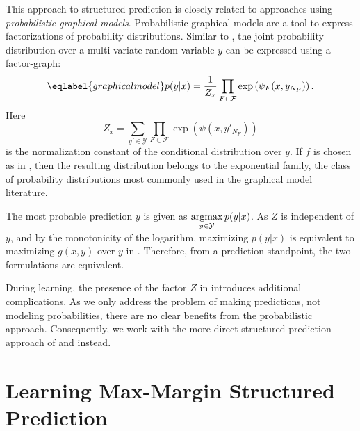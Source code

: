 This approach to structured prediction is closely related to 
approaches using \emph{probabilistic graphical models}.  Probabilistic graphical models are a
tool to express factorizations of probability distributions.  Similar to
, the joint probability distribution over a
multi-variate random variable $y$ can be expressed using a factor-graph:
\begin{equation}\eqlabel{graphicalmodel}
    p(y | x) = \frac{1}{Z_x}\prod_{F \in \mathcal{F}} \exp\left(\psi_F(x, y_{N_F})\right).
\end{equation}
Here
\begin{equation}
    Z_x = \sum_{y' \in \mathcal{Y}} \prod_{F \in \mathcal{F}} \exp\left(\psi(x, y'_{N_F})\right)
\end{equation}
is the normalization constant of the conditional distribution over $y$.
If $f$ is chosen as in , then the resulting distribution
belongs to the exponential family, the class of probability distributions most
commonly used in the graphical model literature.

The most probable prediction $y$ is given as $\displaystyle \operatorname*{argmax}_{y \in \mathcal{Y}}p(y|x)$.
As $Z$ is independent of $y$, and by the monotonicity of the logarithm,
maximizing $p(y|x)$ is equivalent to maximizing $g(x,y)$ over $y$ in
. Therefore, from a prediction standpoint, the two
formulations are equivalent.

During learning, the presence of the factor $Z$ in 
introduces additional complications. As we only address the problem of making
predictions, not modeling probabilities, there are no clear benefits from the
probabilistic approach.  Consequently, we work with the more direct
structured prediction approach of  and
 instead.



\section{Learning Max-Margin Structured Prediction}

